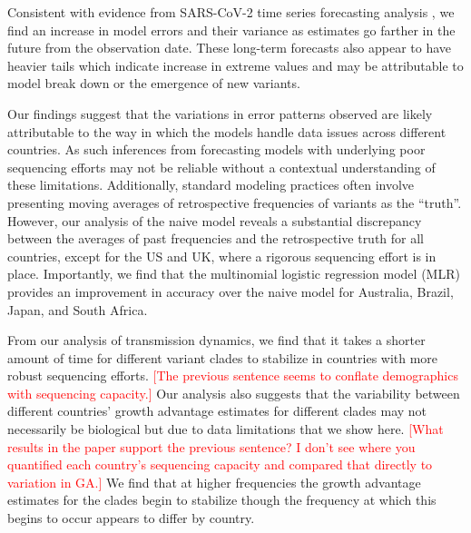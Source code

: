 \documentclass[11pt,oneside,letterpaper]{article}
\def\jhc#1{\textcolor{red}{[#1]}}
\begin{document}
Consistent with evidence from SARS-CoV-2 time series forecasting analysis \cite{cramer2022unitedforecastinghub}, we find an increase in model errors and their variance as estimates go farther in the future from the observation date.
These long-term forecasts also appear to have heavier tails which indicate increase in extreme values and may be attributable to model break down or the emergence of new variants.


Our findings suggest that the variations in error patterns observed are likely attributable to the way in which the models handle data issues across different countries.
As such inferences from forecasting models with underlying poor sequencing efforts may not be reliable without a contextual understanding of these limitations.
Additionally, standard modeling practices often involve presenting moving averages of retrospective frequencies of variants as the ``truth''.
However, our analysis of the naive model reveals a substantial discrepancy between the averages of past frequencies and the retrospective truth for all countries, except for the US and UK, where a rigorous sequencing effort is in place.
Importantly, we find that the multinomial logistic regression model (MLR) provides an improvement in accuracy over the naive model for Australia, Brazil, Japan, and South Africa.


From our analysis of transmission dynamics, we find that it takes a shorter amount of time for different variant clades to stabilize in countries with more robust sequencing efforts.
\jhc{The previous sentence seems to conflate demographics with sequencing capacity.}
Our analysis also suggests that the variability between different countries' growth advantage estimates for different clades may not necessarily be biological but due to data limitations that we show here.
\jhc{What results in the paper support the previous sentence? I don't see where you quantified each country's sequencing capacity and compared that directly to variation in GA.}
We find that at higher frequencies the growth advantage estimates for the clades begin to stabilize though the frequency at which this begins to occur appears to differ by country.
\end{document}
